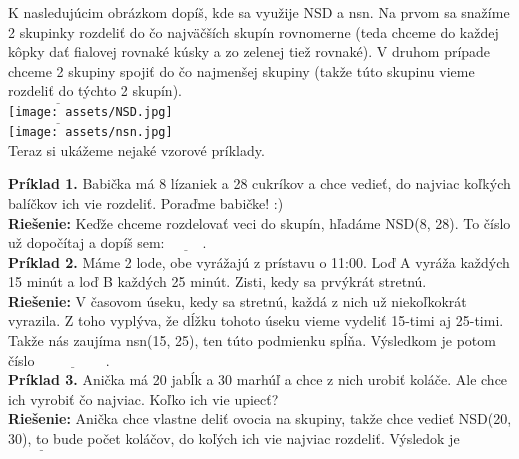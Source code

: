 \documentclass[12pt]{article}
\begin{document}
	K nasledujúcim obrázkom dopíš, kde sa využije NSD a nsn. Na prvom sa snažíme 2 skupinky rozdeliť do čo najväčších skupín rovnomerne (teda chceme do každej kôpky dať fialovej rovnaké kúsky a zo zelenej tiež rovnaké). V druhom prípade chceme 2 skupiny spojiť do čo najmenšej skupiny (takže túto skupinu vieme rozdeliť do týchto 2 skupín).\\
	
	$\underline{\hspace{3cm}}$\\
	\texttt{[image: assets/NSD.jpg]}\\
	\newpage
	  $\underline{\hspace{3cm}}$\\
	\texttt{[image: assets/nsn.jpg]}\\
	
	Teraz si ukážeme nejaké vzorové príklady.
	
	\textbf{Príklad 1.} Babička má 8 lízaniek a 28 cukríkov a chce vedieť, do najviac koľkých balíčkov ich vie rozdeliť. Poraďme babičke! :{)}\\
	
	\textbf{Riešenie:} Keďže chceme rozdelovať veci do skupín, hľadáme NSD(8, 28). To číslo už dopočítaj a dopíš sem: $\underline{\hspace{1cm}}$. \\
	
	\textbf{Príklad 2.} Máme 2 lode, obe vyrážajú z prístavu o 11:00. Loď A vyráža každých 15 minút a loď B každých 25 minút. Zisti, kedy sa prvýkrát stretnú.\\
	
	\textbf{Riešenie:} V časovom úseku, kedy sa stretnú, každá z nich už niekoľkokrát vyrazila. Z toho vyplýva, že dĺžku tohoto úseku vieme vydeliť 15-timi aj 25-timi. Takže nás zaujíma nsn(15, 25), ten túto podmienku spĺňa. Výsledkom je potom číslo $\underline{\hspace{2cm}}$.\\
	
	\textbf{Príklad 3.} Anička má 20 jabĺk a 30 marhúľ a chce z nich urobiť koláče. Ale chce ich vyrobiť čo najviac. Koľko ich vie upiecť?\\
	
	\textbf{Riešenie:} Anička chce vlastne deliť ovocia na skupiny, takže chce vedieť NSD(20, 30), to bude počet koláčov, do koľých ich vie najviac rozdeliť. Výsledok je $\underline{\hspace{2cm}}$\\
	
\end{document}
